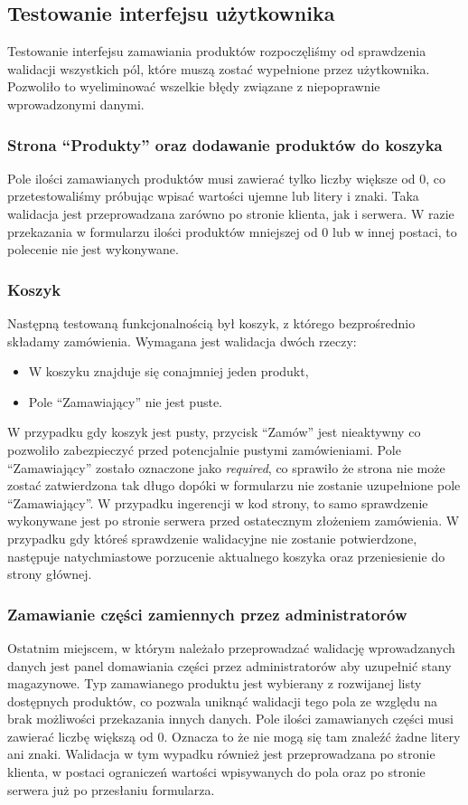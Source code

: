\documentclass{article}
\begin{document}
\subsection{Testowanie interfejsu użytkownika}
Testowanie interfejsu zamawiania produktów rozpoczęliśmy od sprawdzenia
walidacji wszystkich pól, które muszą zostać wypełnione przez użytkownika.
Pozwoliło to wyeliminować wszelkie błędy związane z niepoprawnie wprowadzonymi
danymi.

\subsubsection{Strona ``Produkty'' oraz dodawanie produktów do koszyka}
Pole
ilości zamawianych produktów musi zawierać tylko liczby większe od 0, co
przetestowaliśmy próbując wpisać wartości ujemne lub litery i znaki. Taka
walidacja jest przeprowadzana zarówno po stronie klienta, jak i serwera. W razie
przekazania w formularzu ilości produktów mniejszej od 0 lub w innej postaci, to
polecenie nie jest wykonywane.

\subsubsection{Koszyk}
Następną testowaną funkcjonalnością był koszyk, z którego bezprośrednio składamy
zamówienia. Wymagana jest walidacja dwóch rzeczy:
\begin{itemize}
   \item W koszyku znajduje się conajmniej jeden produkt,
   \item Pole ``Zamawiający'' nie jest puste.
\end{itemize}
W przypadku gdy koszyk jest pusty, przycisk ``Zamów'' jest nieaktywny co pozwoliło
zabezpieczyć przed potencjalnie pustymi zamówieniami. Pole ``Zamawiający'' zostało
oznaczone jako \textit{required}, co sprawiło że strona nie może zostać zatwierdzona
tak długo dopóki w formularzu nie zostanie uzupełnione pole ``Zamawiający''. W przypadku
ingerencji w kod strony, to samo sprawdzenie wykonywane jest po stronie serwera
przed ostatecznym złożeniem zamówienia. W przypadku gdy któreś sprawdzenie
walidacyjne nie zostanie potwierdzone, następuje natychmiastowe porzucenie
aktualnego koszyka oraz przeniesienie do strony głównej.

\subsubsection{Zamawianie części zamiennych przez administratorów}
Ostatnim miejscem, w którym należało przeprowadzać walidację wprowadzanych
danych jest panel domawiania części przez administratorów aby uzupełnić stany
magazynowe. Typ zamawianego produktu jest wybierany z rozwijanej listy
dostępnych produktów, co pozwala uniknąć walidacji tego pola ze względu na brak
możliwości przekazania innych danych. Pole ilości zamawianych części musi
zawierać liczbę większą od 0. Oznacza to że nie mogą się tam znaleźć żadne
litery ani znaki. Walidacja w tym wypadku również jest przeprowadzana po stronie
klienta, w postaci ograniczeń wartości wpisywanych do pola oraz po stronie
serwera już po przesłaniu formularza.
\end{document}
